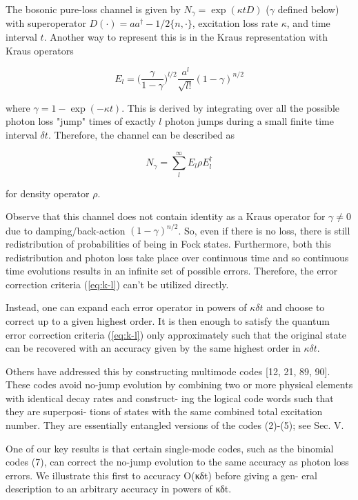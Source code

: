 \documentclass[12]{amsart}
\newcommand\0{\mathbf{0}}
\newcommand\<{\langle}
\renewcommand\>{\rangle}
\begin{document}
The bosonic pure-loss channel is given by $N_\gamma = \exp(\kappa t D)$ ($\gamma$ defined below) with superoperator $D(\cdot) = a a^\dag - 1/2 \{ n , \cdot \}$, excitation loss rate $\kappa$,  and time interval $t$\cite{albert2017performance}. Another way to represent this is in the Kraus representation with Kraus operators

$$
E_l = \Big(\frac{\gamma}{1-\gamma}\Big)^{l / 2} \frac{a^l}{\sqrt{l!}}(1 - \gamma)^{n / 2}
$$

where $\gamma = 1 - \exp(- \kappa t)$. This is derived by integrating over all the possible photon loss "jump" times of exactly $l$ photon jumps during a small finite time interval $\delta t$\cite{chuang1997bosonic}. Therefore, the channel can be described as 

$$
N_\gamma = \sum_l^\infty E_l \rho E_l^\dag
$$

for density operator $\rho$.

Observe that this channel does not contain identity as a Kraus operator for $\gamma \neq 0$ due to damping/back-action $(1-\gamma)^{n / 2}$. So, even if there is no loss, there is still redistribution of probabilities of being in Fock states. Furthermore, both this redistribution and photon loss take place over continuous time and so continuous time evolutions results in an infinite set of possible errors. Therefore, the error correction criteria (\ref{eq:k-l}) can't be utilized directly. 

Instead, one can expand each error operator in powers of $\kappa \delta t$ and choose to correct up to a given highest order. It is then enough to satisfy the quantum error correction criteria (\ref{eq:k-l}) only approximately such that the original state can be recovered with an accuracy given by the same highest order in $\kappa \delta t$\cite{michael2016new}.

Others have addressed this by constructing multimode codes [12, 21, 89, 90]. These codes avoid no-jump evolution by combining two or more physical elements with identical decay rates and construct- ing the logical code words such that they are superposi- tions of states with the same combined total excitation number. They are essentially entangled versions of the codes (2)-(5); see Sec. V.

One of our key results is that certain single-mode codes, such as the binomial codes (7), can correct the no-jump evolution to the same accuracy as photon loss errors. We illustrate this first to accuracy O(κδt) before giving a gen- eral description to an arbitrary accuracy in powers of κδt.
\end{document}
